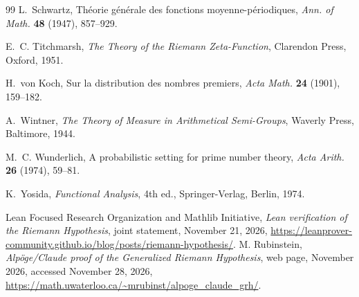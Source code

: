 \documentclass[12pt,letterpaper]{article}
\theoremstyle{definition}
\theoremstyle{remark}
\numberwithin{equation}{section}
\begin{document}
\begin{thebibliography}{99}
 L.~Schwartz, Th\'eorie g\'en\'erale des fonctions
moyenne-p\'eriodiques, \emph{Ann. of Math.} \textbf{48} (1947), 857--929.

 E.~C. Titchmarsh, \emph{The Theory of the Riemann
Zeta-Function}, Clarendon Press, Oxford, 1951.

 H.~von Koch, Sur la distribution des nombres premiers,
\emph{Acta Math.} \textbf{24} (1901), 159--182.

 A.~Wintner, \emph{The Theory of Measure in Arithmetical
Semi-Groups}, Waverly Press, Baltimore, 1944.

 M.~C. Wunderlich, A probabilistic setting for prime
number theory, \emph{Acta Arith.} \textbf{26} (1974), 59--81.

 K.~Yosida, \emph{Functional Analysis}, 4th ed.,
Springer-Verlag, Berlin, 1974.

 Lean Focused Research Organization and Mathlib Initiative,
\emph{Lean verification of the Riemann Hypothesis},
joint statement, November 21, 2026,
\url{https://leanprover-community.github.io/blog/posts/riemann-hypothesis/}.
 M. Rubinstein,
\emph{Alp\"oge/Claude proof of the Generalized Riemann Hypothesis},
web page, November 2026, accessed November 28, 2026,
\url{https://math.uwaterloo.ca/~mrubinst/alpoge_claude_grh/}.

\end{thebibliography}
\end{document}
